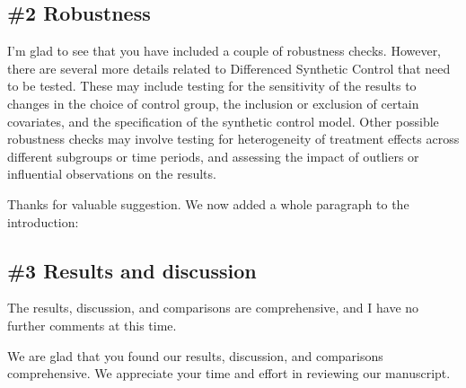 \subsection{\#2 Robustness}\label{sec:2-2}
\RC{} I'm glad to see that you have included a couple of robustness checks. However, there are several more details related to Differenced Synthetic Control that need to be tested. These may include testing for the sensitivity of the results to changes in the choice of control group, the inclusion or exclusion of certain covariates, and the specification of the synthetic control model. Other possible robustness checks may involve testing for heterogeneity of treatment effects across different subgroups or time periods, and assessing the impact of outliers or influential observations on the results.

\AR{} Thanks for valuable suggestion. We now added a whole paragraph to the introduction:

\subsection{\#3 Results and discussion}\label{sec:2-3}
\RC{} The results, discussion, and comparisons are comprehensive, and I have no further comments at this time.

\AR{} We are glad that you found our results, discussion, and comparisons comprehensive. We appreciate your time and effort in reviewing our manuscript.